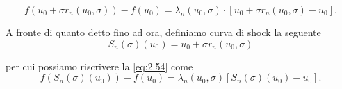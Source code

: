 \begin{equation}\label{eq:2.54}
    f(u_{0}+\sigma r_{n}(u_{0},\sigma))-f(u_{0})=\lambda_{n}(u_{0},\sigma)\cdot[u_{0}+\sigma r_{n}(u_{0},\sigma)-u_{0}].
\end{equation}
\begin{definizione}
    A fronte di quanto detto fino ad ora, definiamo curva di shock la seguente
    \begin{equation}\label{eq:2.55}
        S_{n}(\sigma)(u_{0})=u_{0}+\sigma r_{n}(u_{0},\sigma)
    \end{equation}
\end{definizione}
per cui possiamo riscrivere la \eqref{eq:2.54} come
\begin{equation}\label{eq:2.56}
    f(S_{n}(\sigma)(u_{0}))-f(u_{0})=\lambda_{n}(u_{0},\sigma)[S_{n}(\sigma)(u_{0})-u_{0}].
\end{equation}

